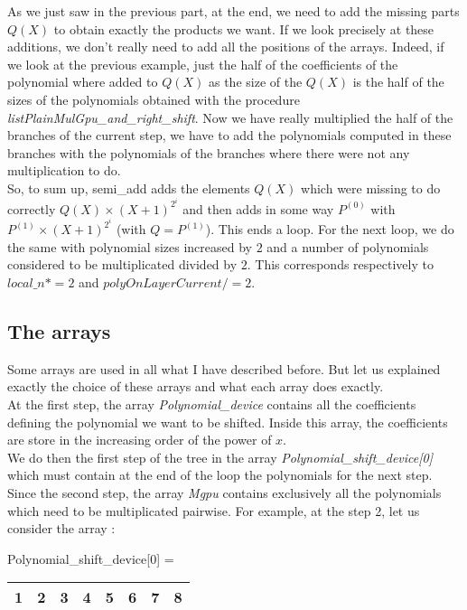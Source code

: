As we just saw in the previous part, at the end, we need to add the missing parts $Q(X)$ to obtain exactly the products we want. If we look precisely at these additions, we don't really need to add all the positions of the arrays. Indeed, if we look at the previous example, just the half of the coefficients of the polynomial where added to $Q(X)$ as the size of the $Q(X)$ is the half of the sizes of the polynomials obtained with the procedure \textit{listPlainMulGpu\_and\_right\_shift}. Now we have really multiplied the half of the branches of the current step, we have to add the polynomials computed in these branches with the polynomials of the branches where there were not any multiplication to do.\\

So, to sum up, semi\_add adds the elements $Q(X)$ which were missing to do correctly $Q(X) \times (X+1)^{2^i}$ and then adds in some way $P^{(0)}$ with $P^{(1)}\times (X+1)^{2^i}$ (with $Q = P^{(1)}$). This ends a loop. For the next loop, we do the same with polynomial sizes increased by $2$ and a number of polynomials considered to be multiplicated divided by $2$. This corresponds respectively to $local\_n *= 2$ and $polyOnLayerCurrent /= 2$.\\

\subsection{The arrays}

Some arrays are used in all what I have described before. But let us explained exactly the choice of these arrays and what each array does exactly.\\

At the first step, the array \textit{Polynomial\_device} contains all the coefficients defining the polynomial we want to be shifted. Inside this array, the coefficients are store in the increasing order of the power of $x$.\\
We do then the first step of the tree in the array \textit{Polynomial\_shift\_device[0]} which must contain at the end of the loop the polynomials for the next step.\\

Since the second step, the array \textit{Mgpu} contains exclusively all the polynomials which need to be multiplicated pairwise. For example, at the step 2, let us consider the array :\\

\begin{center}
Polynomial\_shift\_device[0] = \begin{tabular}{|c|c||c|c||c|c||c|c|}
\hline
1 & 2 & 3 & 4 & 5 & 6 & 7 & 8 \\
\hline
\end{tabular}
\end{center}


